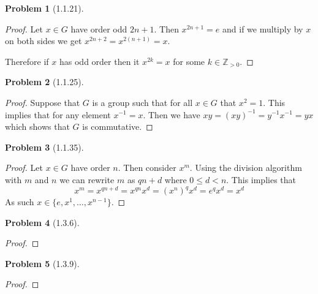 \documentclass[10pt]{article}
\newcommand{\sk}{\vskip 10mm}
\newcommand{\bb}[1]{\mathbb{#1}}
\theoremstyle{plain}
\newtheorem{problem}{Problem}
\theoremstyle{remark}
\begin{document}
\begin{problem}[1.1.21] 
  
\end{problem}

\begin{proof}
  Let $x\in G$ have order odd $2n+1$. Then $x^{2n+1}=e$ and if we multiply by $x$
  on both sides we get $x^{2n+2}=x^{2(n+1)}=x$.

  Therefore if $x$ has odd order then it $x^{2k}=x$ for some $k\in\bb{Z}_{>0}$.
\end{proof}

\sk

\begin{problem}[1.1.25] 
  
\end{problem}

\begin{proof}
  Suppose that $G$ is a group such that for all $x\in G$ that $x^2=1$.
  This implies that for any element $x^{-1}=x$. Then we have
  $xy=(xy)^{-1}=y^{-1}x^{-1}=yx$
  which shows that $G$ is commutative.
\end{proof}

\sk

\begin{problem}[1.1.35] 
  
\end{problem}

\begin{proof}
  Let $x\in G$ have order $n$. Then consider $x^m$. Using the division algorithm
  with $m$ and $n$ we can rewrite $m$ as $qn+d$ where $0\leq d<n$. This implies
  that
  \[ x^m=x^{qn+d}=x^{qn}x^d=(x^n)^qx^d=e^qx^d=x^d \]
  As such $x\in\{e,x^1,\ldots,x^{n-1}\}$.
\end{proof}

\sk

\begin{problem}[1.3.6] 
  
\end{problem}

\begin{proof}
  
\end{proof}

\sk

\begin{problem}[1.3.9] 
  
\end{problem}

\begin{proof}
  
\end{proof}
\end{document}
